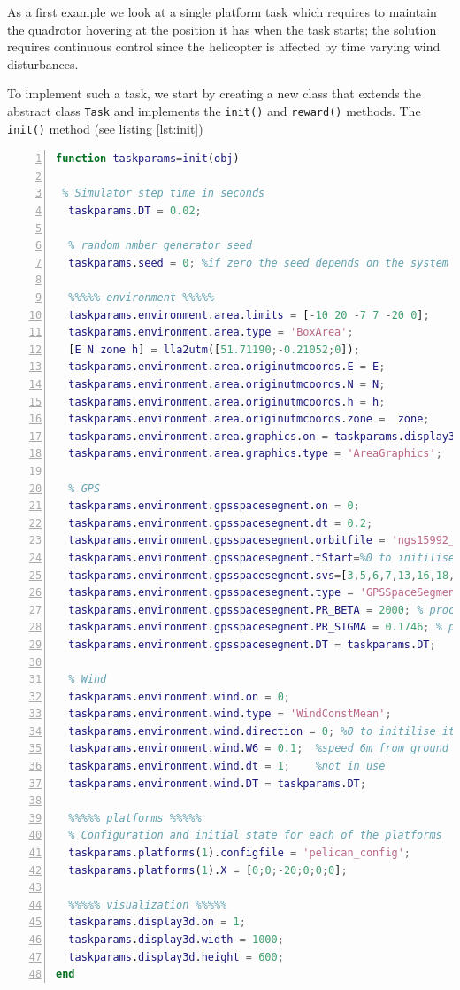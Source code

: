 \documentclass[a4paper,11pt]{report}
\begin{document}
As a first example we look at a single platform task which requires to maintain the quadrotor hovering at the position it has when the task starts; the solution requires continuous control since the helicopter is affected by time varying wind disturbances. 
 
To implement such a task, we start by creating a new class that extends the abstract class \texttt{Task} and implements the \texttt{init()} and \texttt{reward()} methods.
The \texttt{init()} method (see listing \ref{lst:init}) 
\begin{lstlisting}[float=ht!bp,caption=KeepSpot init() method,language=Matlab,frame=lines,label=lst:init,numbers=left,basicstyle=\small]
function taskparams=init(obj)
 
 % Simulator step time in seconds
  taskparams.DT = 0.02;
            
  % random nmber generator seed
  taskparams.seed = 0; %if zero the seed depends on the system time         
            
  %%%%% environment %%%%%
  taskparams.environment.area.limits = [-10 20 -7 7 -20 0];
  taskparams.environment.area.type = 'BoxArea';
  [E N zone h] = lla2utm([51.71190;-0.21052;0]);
  taskparams.environment.area.originutmcoords.E = E;
  taskparams.environment.area.originutmcoords.N = N;
  taskparams.environment.area.originutmcoords.h = h;
  taskparams.environment.area.originutmcoords.zone =  zone;
  taskparams.environment.area.graphics.on = taskparams.display3d.on;
  taskparams.environment.area.graphics.type = 'AreaGraphics';
            
  % GPS
  taskparams.environment.gpsspacesegment.on = 0; 
  taskparams.environment.gpsspacesegment.dt = 0.2;
  taskparams.environment.gpsspacesegment.orbitfile = 'ngs15992_16to17.sp3';
  taskparams.environment.gpsspacesegment.tStart=%0 to initilise it randomly
  taskparams.environment.gpsspacesegment.svs=[3,5,6,7,13,16,18,19,20,22,24,29,31];
  taskparams.environment.gpsspacesegment.type = 'GPSSpaceSegmentGM';
  taskparams.environment.gpsspacesegment.PR_BETA = 2000; % process tau
  taskparams.environment.gpsspacesegment.PR_SIGMA = 0.1746; % process std
  taskparams.environment.gpsspacesegment.DT = taskparams.DT;
            
  % Wind
  taskparams.environment.wind.on = 0;
  taskparams.environment.wind.type = 'WindConstMean';
  taskparams.environment.wind.direction = 0; %0 to initilise it randomly
  taskparams.environment.wind.W6 = 0.1;  %speed 6m from ground in m/s
  taskparams.environment.wind.dt = 1;    %not in use
  taskparams.environment.wind.DT = taskparams.DT;
            
  %%%%% platforms %%%%%
  % Configuration and initial state for each of the platforms
  taskparams.platforms(1).configfile = 'pelican_config';
  taskparams.platforms(1).X = [0;0;-20;0;0;0]; 

  %%%%% visualization %%%%%
  taskparams.display3d.on = 1;
  taskparams.display3d.width = 1000;
  taskparams.display3d.height = 600;            
end
\end{lstlisting}
\end{document}
